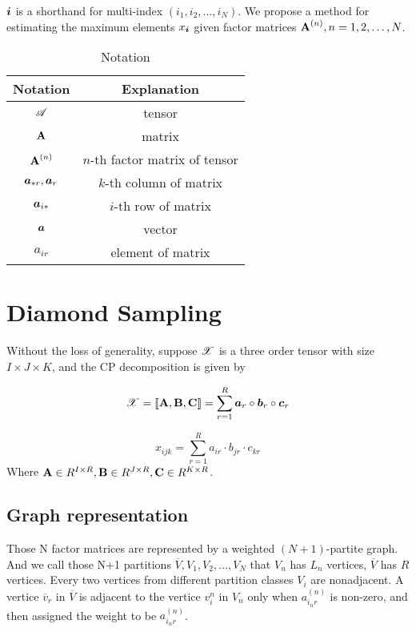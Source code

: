 \documentclass{article}
\newcommand{\Sca}[3]{{#1}^{(#2)}_{i_#2#3}}%
\newcommand{\T}[1]{\boldsymbol{\mathscr{\MakeUppercase{#1}}}}%
\newcommand{\V}[1]{{\bm{{\MakeLowercase{#1}}}}}%
\newcommand{\M}[1]{{\bm{\mathbf{\MakeUppercase{#1}}}}}%
\newcommand{\Mn}[2]{\M{#1}^{(#2)}}%
\newcommand{\KT}[1]{\left\llbracket #1 \right\rrbracket}
\begin{document}
$\V{i}$ is a shorthand for multi-index $(i_1,i_2,\ldots,i_N)$. We propose a method for
estimating the maximum elements $x_\V{i}$ given factor matrices $\Mn{A}{n}, n = 1,2,\ldots,N$.

\begin{table}
  \centering
  \begin{tabular}{|c|c|}
    \hline
    Notation & Explanation \\
    \hline
    $\T{A}$ & tensor \\
    $\M{A}$ & matrix \\
    $\Mn{A}{n}$ & $n$-th factor matrix of tensor\\
    $\V{A}_{*r},\V{A}_r$ & $k$-th column of matrix \\
    $\V{A}_{i*}$ & $i$-th row of matrix \\
    $\V{A}$ & vector \\
    $a_{ir}$ & element of matrix\\
    \hline
  \end{tabular}
  \caption{Notation}\label{table:Notation}
\end{table}
\section{Diamond Sampling}
Without the loss of generality, suppose $\T{X}$ is a three order tensor with size $I\times J\times K$, and the CP decomposition is given by

\begin{equation}\label{eq:ThreeWayTensorCP}
\T{X}= \KT{\M{A},\M{B},\M{C}}=
\sum_{r=1}^{R}\V{a}_r \circ \V{b}_r \circ \V{c}_r
\end{equation}

\begin{equation}\label{eq:ValueInThreeWayTensor}
x_{ijk} = \sum_{r=1}^{R} a_{ir}\cdot b_{jr}\cdot c_{kr}
\end{equation}
Where $\M{A}\in R^{I\times R},\M{B}\in R^{J\times R},\M{C}\in R^{K\times R}$.
\subsection{Graph representation}
Those N factor matrices are represented by a weighted $(N+1)$-partite graph. And we call those N+1 partitions $\overline{V},V_{1},V_{2},\ldots,V_{N}$ that $V_{n}$ has $L_n$ vertices, $\overline{V}$ has $R$ vertices. Every two vertices from different partition classes $V_i$ are nonadjacent. A vertice $\overline{v}_r$ in $\overline{V}$ is adjacent to the vertice $v^n_i$ in $V_n$ only when $\Sca{a}{n}{r}$ is non-zero, and then assigned the weight to be $\Sca{a}{n}{r}$.
\end{document}

